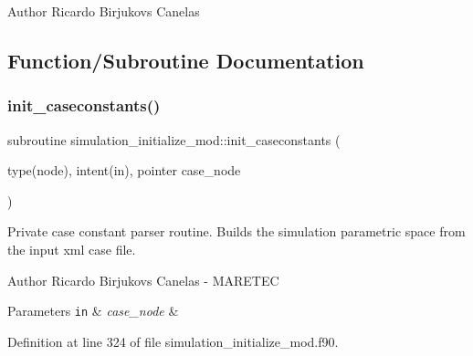\begin{DoxyAuthor}{Author}
Ricardo Birjukovs Canelas 
\end{DoxyAuthor}


\subsection{Function/\+Subroutine Documentation}
\mbox{\label{namespacesimulation__initialize__mod_a97705c918360827c6fc76170b5eeb9bb}} 
\subsubsection{\texorpdfstring{init\+\_\+caseconstants()}{init\_caseconstants()}}
{\footnotesize\ttfamily subroutine simulation\+\_\+initialize\+\_\+mod\+::init\+\_\+caseconstants (\begin{DoxyParamCaption}\item[{type(node), intent(in), pointer}]{case\+\_\+node }\end{DoxyParamCaption})\hspace{0.3cm}{\ttfamily [private]}}



Private case constant parser routine. Builds the simulation parametric space from the input xml case file. 

\begin{DoxyAuthor}{Author}
Ricardo Birjukovs Canelas -\/ M\+A\+R\+E\+T\+EC 
\end{DoxyAuthor}

\begin{DoxyParams}[1]{Parameters}
\mbox{\tt in}  & {\em case\+\_\+node} & \\
\hline
\end{DoxyParams}


Definition at line 324 of file simulation\+\_\+initialize\+\_\+mod.\+f90.


